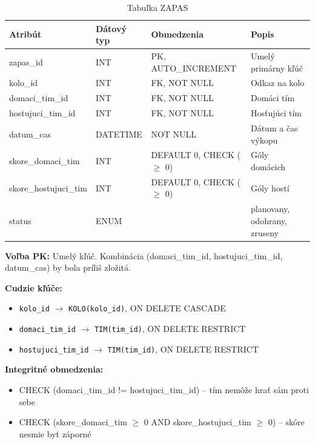 \documentclass[11pt, a4paper]{article}
\begin{document}
\begin{table}[H]
    \centering
    \caption{Tabuľka ZAPAS}
    \label{tab:zapas}
    \begin{tabular}{l l l l}
        \toprule
        \textbf{Atribút} & \textbf{Dátový typ} & \textbf{Obmedzenia} & \textbf{Popis} \\
        \midrule
        zapas\_id             & INT      & PK, AUTO\_INCREMENT          & Umelý primárny kľúč \\
        kolo\_id              & INT      & FK, NOT NULL                & Odkaz na kolo \\
        domaci\_tim\_id       & INT      & FK, NOT NULL                & Domáci tím \\
        hostujuci\_tim\_id    & INT      & FK, NOT NULL                & Hosťujúci tím \\
        datum\_cas            & DATETIME & NOT NULL                    & Dátum a čas výkopu \\
        skore\_domaci\_tim    & INT      & DEFAULT 0, CHECK ($\geq$ 0) & Góly domácich \\
        skore\_hostujuci\_tim & INT      & DEFAULT 0, CHECK ($\geq$ 0) & Góly hostí \\
        status                & ENUM     &                             & planovany, odohrany, zruseny \\
        \bottomrule
    \end{tabular}
\end{table}

\textbf{Voľba PK:} Umelý kľúč. Kombinácia (domaci\_tim\_id, hostujuci\_tim\_id, datum\_cas) by bola príliš zložitá.

\textbf{Cudzie kľúče:}
\begin{itemize}
    \item \texttt{kolo\_id} $\rightarrow$ \texttt{KOLO(kolo\_id)}, ON DELETE CASCADE
    \item \texttt{domaci\_tim\_id} $\rightarrow$ \texttt{TIM(tim\_id)}, ON DELETE RESTRICT
    \item \texttt{hostujuci\_tim\_id} $\rightarrow$ \texttt{TIM(tim\_id)}, ON DELETE RESTRICT
\end{itemize}

\textbf{Integritné obmedzenia:}
\begin{itemize}
    \item CHECK (domaci\_tim\_id != hostujuci\_tim\_id) -- tím nemôže hrať sám proti sebe
    \item CHECK (skore\_domaci\_tim $\geq$ 0 AND skore\_hostujuci\_tim $\geq$ 0) -- skóre nesmie byť záporné
\end{itemize}
\end{document}
